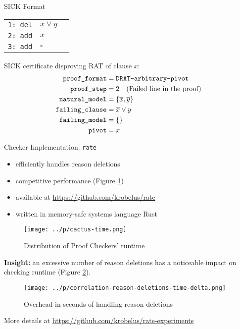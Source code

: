 \documentclass[final,hyperref={pdfpagelabels=true}]{beamer}
\begin{document}
\begin{frame}[fragile]
\begin{columns}[t]
\begin{column}{.45\textwidth}
\begin{block}{SICK Format}
	\begin{tabular}{lll}
    		\texttt{1: del} & $x \lor y$		& \\
    		\texttt{2: add} & $x$			& \\
    		\texttt{3: add} & $\square$		& \\
	\end{tabular}

        \vspace{.5cm}
	SICK certificate disproving RAT of clause $x$:
        \begin{align*}
            \texttt{proof\_format}	&= \texttt{DRAT-arbitrary-pivot}		\\
	    \texttt{proof\_step}	&= 2 \text{\quad (Failed line in the proof)}	\\
	    \texttt{natural\_model}	&= \{\overline{x}, \overline{y}\}		\\
	    \texttt{failing\_clause}	&= \overline{x} \lor y				\\
	    \texttt{failing\_model}	&= \{\}						\\
	    \texttt{pivot}		&= x						
        \end{align*}
    \end{block}
    \begin{block}{Checker Implementation: \texttt{rate}}
        \begin{itemize}
            \item efficiently handles reason deletions
            \item competitive performance (Figure \ref{fig:cactus-time})
            \item available at \url{https://github.com/krobelus/rate}
            \item written in memory-safe systems language Rust
        \end{itemize}
    \begin{figure}
        \centering
        \caption{Distribution of Proof Checkers' runtime\label{fig:cactus-time}}
        \texttt{[image: ../p/cactus-time.png]}
    \end{figure}

    \textbf{Insight:} an excessive number of reason deletions
    has a noticeable impact on checking runtime (Figure
    \ref{fig:correlation-reason-deletions-time-delta}).

    \vspace{.5cm}

    \begin{figure}
        \centering
        \caption{Overhead in seconds of handling reason deletions\label{fig:correlation-reason-deletions-time-delta}}
        \texttt{[image: ../p/correlation-reason-deletions-time-delta.png]}
    \end{figure}

        More details at \url{https://github.com/krobelus/rate-experiments}

    \end{block}
    \end{column}
  \end{columns}
\end{frame}
\end{document}
